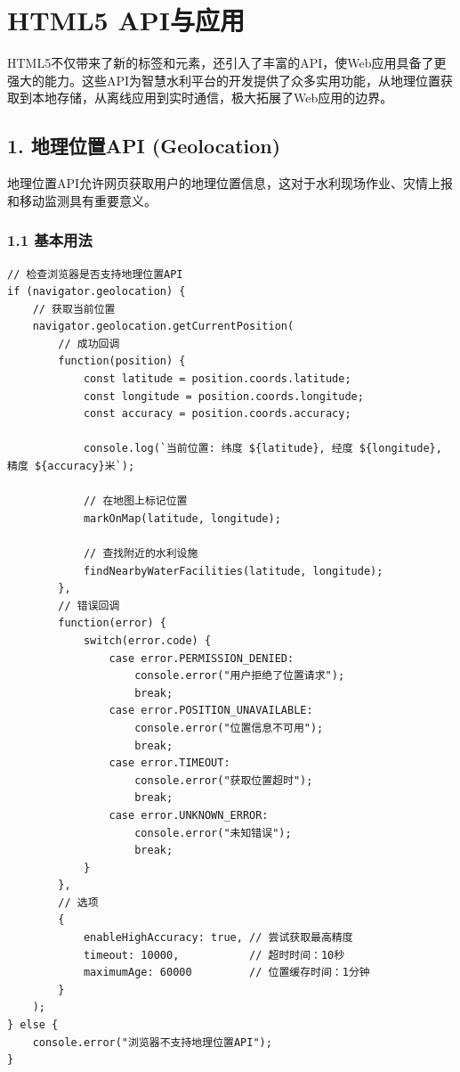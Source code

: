 \section{HTML5 API与应用}\label{html5-apiux4e0eux5e94ux7528}

HTML5不仅带来了新的标签和元素，还引入了丰富的API，使Web应用具备了更强大的能力。这些API为智慧水利平台的开发提供了众多实用功能，从地理位置获取到本地存储，从离线应用到实时通信，极大拓展了Web应用的边界。

\subsection{1. 地理位置API
(Geolocation)}\label{ux5730ux7406ux4f4dux7f6eapi-geolocation}

地理位置API允许网页获取用户的地理位置信息，这对于水利现场作业、灾情上报和移动监测具有重要意义。

\subsubsection{1.1 基本用法}\label{ux57faux672cux7528ux6cd5}

\begin{lstlisting}
// 检查浏览器是否支持地理位置API
if (navigator.geolocation) {
    // 获取当前位置
    navigator.geolocation.getCurrentPosition(
        // 成功回调
        function(position) {
            const latitude = position.coords.latitude;
            const longitude = position.coords.longitude;
            const accuracy = position.coords.accuracy;
            
            console.log(`当前位置: 纬度 ${latitude}, 经度 ${longitude}, 精度 ${accuracy}米`);
            
            // 在地图上标记位置
            markOnMap(latitude, longitude);
            
            // 查找附近的水利设施
            findNearbyWaterFacilities(latitude, longitude);
        },
        // 错误回调
        function(error) {
            switch(error.code) {
                case error.PERMISSION_DENIED:
                    console.error("用户拒绝了位置请求");
                    break;
                case error.POSITION_UNAVAILABLE:
                    console.error("位置信息不可用");
                    break;
                case error.TIMEOUT:
                    console.error("获取位置超时");
                    break;
                case error.UNKNOWN_ERROR:
                    console.error("未知错误");
                    break;
            }
        },
        // 选项
        {
            enableHighAccuracy: true, // 尝试获取最高精度
            timeout: 10000,           // 超时时间：10秒
            maximumAge: 60000         // 位置缓存时间：1分钟
        }
    );
} else {
    console.error("浏览器不支持地理位置API");
}
\end{lstlisting}


